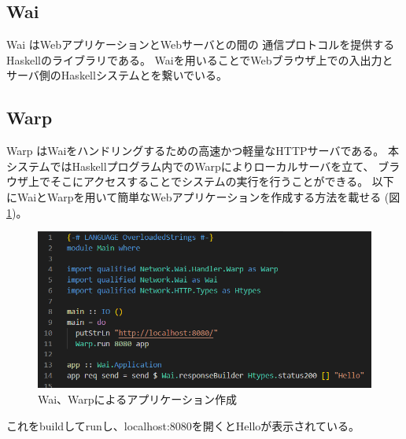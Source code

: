 \documentclass{csspaper}
\begin{document}
      \subsection{Wai}
      Wai \cite{10}はWebアプリケーションとWebサーバとの間の
      通信プロトコルを提供するHaskellのライブラリである。
      Waiを用いることでWebブラウザ上での入出力と
      サーバ側のHaskellシステムとを繋いでいる。

      \subsection{Warp}
      Warp \cite{11}はWaiをハンドリングするための高速かつ軽量なHTTPサーバである。
      本システムではHaskellプログラム内でのWarpによりローカルサーバを立て、
      ブラウザ上でそこにアクセスすることでシステムの実行を行うことができる。
      以下にWaiとWarpを用いて簡単なWebアプリケーションを作成する方法を載せる (図\ref{fig:warp})。

      \begin{figure}[h]
         \includegraphics[width=15cm]{wai.png}
         \caption{Wai、Warpによるアプリケーション作成}
         \label{fig:warp}
      \end{figure}

      これをbuildしてrunし、localhost:8080を開くとHelloが表示されている。

\end{document}
